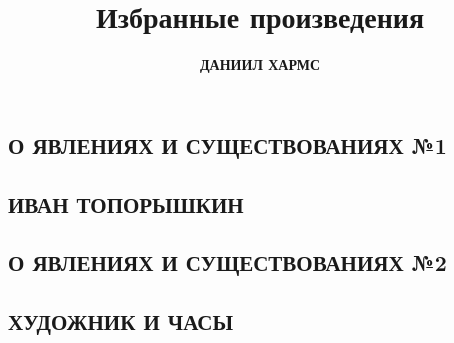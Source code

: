 \documentclass[a4paper]{article}
\begin{document}
\title{\textbf{Избранные произведения}}

\author{\textbf{ДАНИИЛ ХАРМС}}
\date{}
\maketitle

\begin{center}
\section*{О ЯВЛЕНИЯХ И СУЩЕСТВОВАНИЯХ №1}
\end{center}


\begin{center}
\section*{ИВАН ТОПОРЫШКИН}
\end{center}


\begin{center}
\section*{О ЯВЛЕНИЯХ И СУЩЕСТВОВАНИЯХ №2}
\end{center}


\begin{center}
\section*{ХУДОЖНИК И ЧАСЫ}
\end{center}

\end{document}
